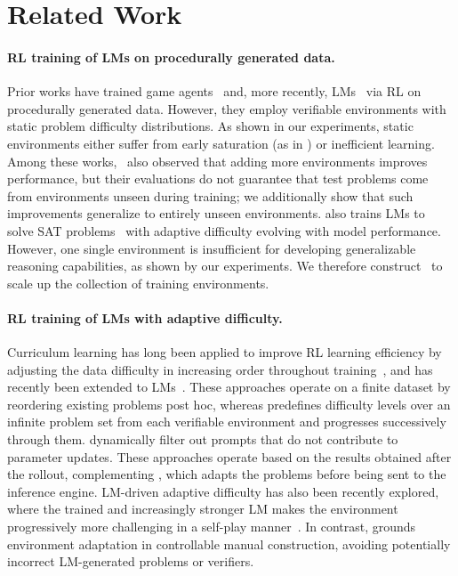 \documentclass{article}
\theoremstyle{plain}
\theoremstyle{definition}
\theoremstyle{remark}
\begin{document}
\section{Related Work}
\paragraph{RL training of LMs on procedurally generated data.}
Prior works have trained game agents~\citep{cobbe2020proceduralgeneration} and, more recently, LMs~\citep{hu2025beyondaha,chen2025enigmata,liu2025synlogic,stojanovski2025reasoning-gym,li2025internbootcamp} via RL on procedurally generated data.
However, they employ verifiable environments with static problem difficulty distributions.
As shown in our experiments, static environments either suffer from early saturation (as in \citet{li2025internbootcamp}) or inefficient learning.
Among these works,~\citet{li2025internbootcamp} also observed that adding more environments improves performance, but their evaluations do not guarantee that test problems come from environments unseen during training;
we additionally show that such improvements generalize to entirely unseen environments.
\citet{liu2025saturn} also trains LMs to solve SAT problems~\citep{cook1971sat} with adaptive difficulty evolving with model performance.
However, one single environment is insufficient for developing generalizable reasoning capabilities, as shown by our experiments.
We therefore construct~\suite{} to scale up the collection of training environments.

\paragraph{RL training of LMs with adaptive difficulty.}
Curriculum learning has long been applied to improve RL learning efficiency by adjusting the data difficulty in increasing order throughout training~\citep{Baker2019EmergentTU,Wang2019PairedOT,Portelas2020AutomaticCL,Jiang2020PrioritizedLR,gao2025prompt-curriculum}, and has recently been extended to LMs~\citep{kimi1.5,shi2025adarft,chen2025self-evolving-curriculum}.
These approaches operate on a finite dataset by reordering existing problems post hoc, whereas \ours{} predefines difficulty levels over an infinite problem set from each verifiable environment and progresses successively through them.
\citet{Cui2025ProcessRT,yu2025dapo} dynamically filter out prompts that do not contribute to parameter updates.
These approaches operate based on the results obtained after the rollout, complementing \ours{}, which adapts the problems before being sent to the inference engine.
LM-driven adaptive difficulty has also been recently explored, where the trained and increasingly stronger LM makes the environment progressively more challenging in a self-play manner~\citep{Zhao2025AbsoluteZR,liu2025spiral,liu2025spice}.
In contrast, \ours{} grounds environment adaptation in controllable manual construction, avoiding potentially incorrect LM-generated problems or verifiers.
\end{document}
